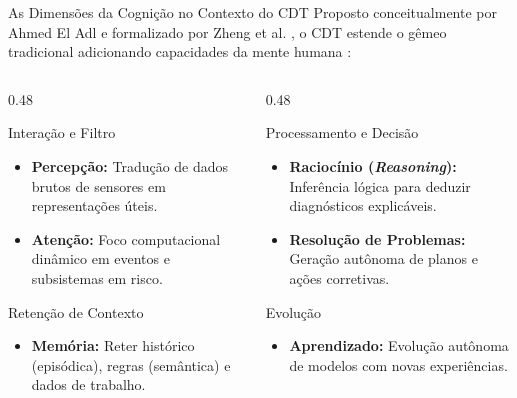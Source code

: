 \documentclass[aspectratio=169,xcolor=dvipsnames]{beamer}
\begin{document}
\begin{frame}{As Dimensões da Cognição no Contexto do CDT}
    Proposto conceitualmente por Ahmed El Adl \cite{eladl2016cdt} e formalizado por Zheng et al. \cite{zheng2022emergence}, o CDT estende o gêmeo tradicional adicionando capacidades da mente humana \cite{alfaruque2021cdt} :
    \begin{columns}[T]
        \begin{column}{0.48\textwidth}
            \begin{block}{Interação e Filtro}
                \footnotesize
                \begin{itemize}\setlength\itemsep{0pt}
                    \item \textbf{Percepção:} Tradução de dados brutos de sensores em representações úteis.
                    \item \textbf{Atenção:} Foco computacional dinâmico em eventos e subsistemas em risco.
                \end{itemize}
            \end{block}
            \begin{block}{Retenção de Contexto}
                \footnotesize
                \begin{itemize}\setlength\itemsep{0pt}
                    \item \textbf{Memória:} Reter histórico (episódica), regras (semântica) e dados de trabalho.
                \end{itemize}
            \end{block}
        \end{column}
        \begin{column}{0.48\textwidth}
            \begin{block}{Processamento e Decisão}
                \footnotesize
                \begin{itemize}\setlength\itemsep{0pt}
                    \item \textbf{Raciocínio (\textit{Reasoning}):} Inferência lógica para deduzir diagnósticos explicáveis.
                    \item \textbf{Resolução de Problemas:} Geração autônoma de planos e ações corretivas.
                \end{itemize}
            \end{block}
            \begin{block}{Evolução}
                \footnotesize
                \begin{itemize}\setlength\itemsep{0pt}
                    \item \textbf{Aprendizado:} Evolução autônoma de modelos com novas experiências.
                \end{itemize}
            \end{block}
        \end{column}
    \end{columns}
\end{frame}
\end{document}
